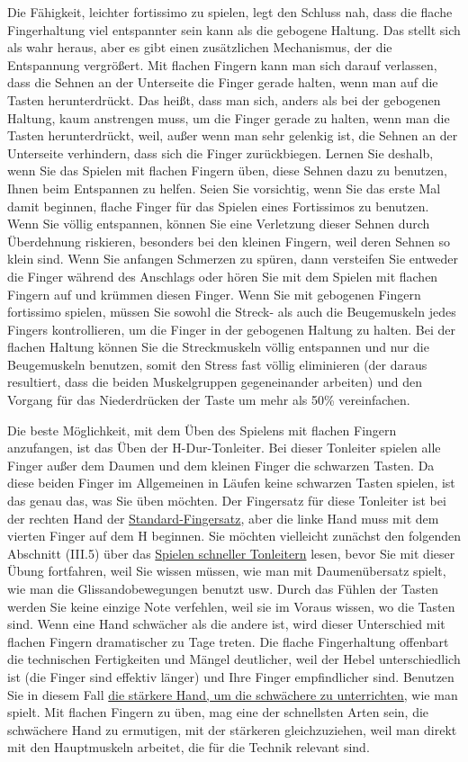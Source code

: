 Die Fähigkeit, leichter fortissimo zu spielen, legt den Schluss nah, dass die flache Fingerhaltung viel entspannter sein kann als die gebogene Haltung.
Das stellt sich als wahr heraus, aber es gibt einen zusätzlichen Mechanismus, der die Entspannung vergrößert.
Mit flachen Fingern kann man sich darauf verlassen, dass die Sehnen an der Unterseite die Finger gerade halten, wenn man auf die Tasten herunterdrückt.
Das heißt, dass man sich, anders als bei der gebogenen Haltung, kaum anstrengen muss, um die Finger gerade zu halten, wenn man die Tasten herunterdrückt, weil, außer wenn man sehr gelenkig ist, die Sehnen an der Unterseite verhindern, dass sich die Finger zurückbiegen.
Lernen Sie deshalb, wenn Sie das Spielen mit flachen Fingern üben, diese Sehnen dazu zu benutzen, Ihnen beim Entspannen zu helfen.
Seien Sie vorsichtig, wenn Sie das erste Mal damit beginnen, flache Finger für das Spielen eines Fortissimos zu benutzen.
Wenn Sie völlig entspannen, können Sie eine Verletzung dieser Sehnen durch Überdehnung riskieren, besonders bei den kleinen Fingern, weil deren Sehnen so klein sind.
Wenn Sie anfangen Schmerzen zu spüren, dann versteifen Sie entweder die Finger während des Anschlags oder hören Sie mit dem Spielen mit flachen Fingern auf und krümmen diesen Finger.
Wenn Sie mit gebogenen Fingern fortissimo spielen, müssen Sie sowohl die Streck- als auch die Beugemuskeln jedes Fingers kontrollieren, um die Finger in der gebogenen Haltung zu halten.
Bei der flachen Haltung können Sie die Streckmuskeln völlig entspannen und nur die Beugemuskeln benutzen, somit den Stress fast völlig eliminieren (der daraus resultiert, dass die beiden Muskelgruppen gegeneinander arbeiten) und den Vorgang für das Niederdrücken der Taste um mehr als 50\% vereinfachen.

Die beste Möglichkeit, mit dem Üben des Spielens mit flachen Fingern anzufangen, ist das Üben der H-Dur-Tonleiter.
Bei dieser Tonleiter spielen alle Finger außer dem Daumen und dem kleinen Finger die schwarzen Tasten.
Da diese beiden Finger im Allgemeinen in Läufen keine schwarzen Tasten spielen, ist das genau das, was Sie üben möchten.
Der Fingersatz für diese Tonleiter ist bei der rechten Hand der \hyperref[table]{Standard-Fingersatz}, aber die linke Hand muss mit dem vierten Finger auf dem H beginnen.
Sie möchten vielleicht zunächst den folgenden Abschnitt (III.5) über das \hyperref[c1iii5]{Spielen schneller Tonleitern} lesen, bevor Sie mit dieser Übung fortfahren, weil Sie wissen müssen, wie man mit Daumenübersatz spielt, wie man die Glissandobewegungen benutzt usw.
Durch das Fühlen der Tasten werden Sie keine einzige Note verfehlen, weil sie im Voraus wissen, wo die Tasten sind.
Wenn eine Hand schwächer als die andere ist, wird dieser Unterschied mit flachen Fingern dramatischer zu Tage treten. Die flache Fingerhaltung offenbart die technischen Fertigkeiten und Mängel deutlicher, weil der Hebel unterschiedlich ist (die Finger sind effektiv länger) und Ihre Finger empfindlicher sind.
Benutzen Sie in diesem Fall \hyperref[c1ii20]{die stärkere Hand, um die schwächere zu unterrichten}, wie man spielt.
Mit flachen Fingern zu üben, mag eine der schnellsten Arten sein, die schwächere Hand zu ermutigen, mit der stärkeren gleichzuziehen, weil man direkt mit den Hauptmuskeln arbeitet, die für die Technik relevant sind.

